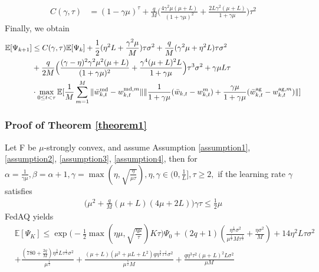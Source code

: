 \documentclass[11pt]{article}
\begin{document}
\begin{align*}
    C(\gamma, \tau) &= (1-\gamma\mu)^\tau + \frac{q}{M}\Big( \frac{4\gamma^2\mu(\mu + L)}{(1+\gamma\mu)^2} + \frac{2L\gamma^2(\mu+L)}{1+\gamma\mu}\Big)\tau^2
\end{align*}
Finally, we obtain
\begin{align*}
    \mathbb{E}[\Psi_{k+1}] &\leq C(\gamma, \tau)\mathbb{E}[\Psi_k] + \frac{1}{2}(\eta^2 L+\frac{\gamma^2\mu}{M})\tau\sigma^2 + \frac{q}{M}(\gamma^2\mu+\eta^2 L)\tau\sigma^2 \\
    &+ \frac{q}{2M}\Big(\frac{(\gamma-\eta)^2\gamma^2\mu^2(\mu+L)}{(1+\gamma\mu)^2} + \frac{\gamma^4(\mu+L)^2 L}{1+\gamma\mu}\Big)\tau^3\sigma^2 + \gamma\mu L \tau \\
    &\cdot \max_{0\leq t <\tau} \mathbb{E}[\frac{1}{M} \sum_{m=1}^M \|\Bar{w}_{k, t}^{\textrm{md}} - w_{k, t}^{\textrm{md}, m}\|\|\frac{1}{1+\gamma\mu}(\Bar{w}_{k, t} - w_{k, t}^m) + \frac{\gamma\mu}{1+\gamma\mu}(\Bar{w}_{k, t}^{\textrm{ag}} - w_{k, t}^{\textrm{ag}, m})\|]
\end{align*}

\subsubsection{Proof of Theorem \ref{theorem1}}
\label{app:proof_theorem}

\begin{theorem} \label{theorem1}
    Let F be $\mu$-strongly convex, and assume Assumption \ref{assumption1}, \ref{assumption2}, \ref{assumption3}, \ref{assumption4}, then for $\alpha=\frac{1}{\gamma\mu}, \beta=\alpha+1, \gamma = \max(\eta, \sqrt{\frac{\eta}{\mu\tau}}), \eta, \gamma \in (0, \frac{1}{L}], \tau \geq 2, $ if the learning rate $\gamma$ satisfies
    \begin{align} \label{condition1}
        \Big(\mu^2 + \frac{q}{M}(\mu+L)(4\mu+2L)\Big)\gamma\tau \leq \frac{1}{2}\mu
    \end{align}
    FedAQ yields
    \begin{align*}
        &\mathbb{E}[\Psi_K] \leq \exp{\Big(-\frac{1}{2}\max(\eta\mu, \sqrt{\frac{\eta\mu}{\tau}})K\tau\Big)} \Psi_0 + (2q+1)(\frac{\eta^{\frac{1}{2}}\sigma^2}{\mu^{\frac{1}{2}}M\tau^{\frac{1}{2}}} + \frac{\eta\sigma^2}{M}) + 14\eta^2 L\tau\sigma^2 \\
        &+ \frac{(780+\frac{2q}{M})\eta^{\frac{3}{2}}L\tau^{\frac{1}{2}}\sigma^2}{\mu^{\frac{1}{2}}} + \frac{(\mu+L)(\mu^2+\mu L+L^2)q\eta^{\frac{3}{2}}\tau^{\frac{1}{2}}\sigma^2}{\mu^{\frac{5}{2}}M} + \frac{q\eta^3\tau^2(\mu+L)^2 L\sigma^2}{\mu M}
    \end{align*}
\end{theorem}
\end{document}
